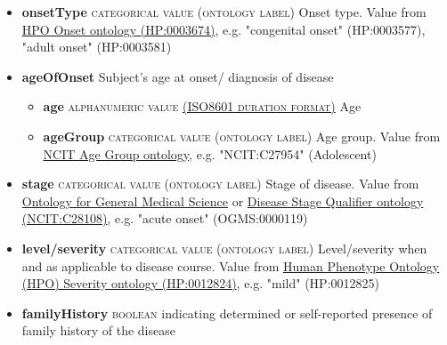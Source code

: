 \documentclass[a4paper, 10pt]{article}        %
\begin{document}
\begin{description}
\begin{itemize}
			\item[] \textbf{onsetType} {\textsc{categorical value (ontology label)}}
 Onset type. Value from \href{http://purl.obolibrary.org/obo/HP_0003674}{HPO Onset ontology (HP:0003674)}, e.g. "congenital onset" (HP:0003577), "adult onset" (HP:0003581)
			\item[]  \textbf{ageOfOnset} Subject's age at onset/ diagnosis of disease
			\begin{itemize}
			\item[] \textbf{age} {\textsc{alphanumeric value \href{https://www.iso.org/iso-8601-date-and-time-format.html}{(ISO8601 duration format)}}} Age  
			\item[] \textbf{ageGroup} {\textsc{categorical value (ontology label)}} Age group. Value from \href{https://www.ebi.ac.uk/ols/ontologies/ncit/terms?iri=http%3A%2F%2Fpurl.obolibrary.org%2Fobo%2FNCIT_C20587}{NCIT Age Group ontology}, e.g. "NCIT:C27954" (Adolescent)
			\end{itemize}
			\item[]  \textbf{stage} {\textsc{categorical value (ontology label)}} Stage of disease. Value from \href{https://www.ebi.ac.uk/ols/ontologies/ogms}{Ontology for General Medical Science} or \href{https://www.ebi.ac.uk/ols/ontologies/ncit/terms?iri=http%3A%2F%2Fpurl.obolibrary.org%2Fobo%2FNCIT_C28108}{Disease Stage Qualifier ontology (NCIT:C28108)}, e.g. "acute onset" (OGMS:0000119)
			\item[] \textbf{level/severity} {\textsc{categorical value (ontology label)}} Level/severity when and as applicable to disease course. Value from \href{http://purl.obolibrary.org/obo/HP_0012824}{Human Phenotype Ontology (HPO) Severity ontology (HP:0012824)}, e.g. "mild" (HP:0012825)
			\item[] \textbf{familyHistory} {\textsc{boolean}} indicating determined or self-reported presence of family history of the disease
	\end{itemize}


\end{description}
\end{document}

